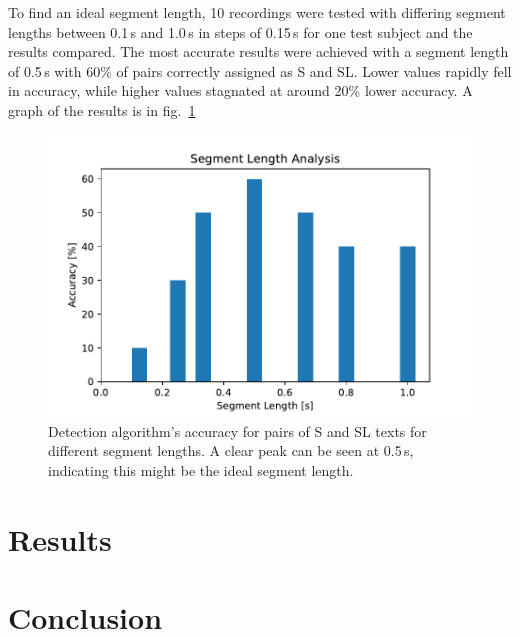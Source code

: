 \documentclass{IEEEtran}
\begin{document}
To find an ideal segment length,
10 recordings were tested with differing segment lengths between 0.1\,s and 1.0\,s in steps of 0.15\,s for one test subject and the results compared.
The most accurate results were achieved with a segment length of 0.5\,s with 60\% of pairs correctly assigned as S and SL.
Lower values rapidly fell in accuracy,
while higher values stagnated at around 20\% lower accuracy.
A graph of the results is in fig.\ \ref{segmentlength}

\begin{figure}[h]
\centering
\includegraphics[scale=0.5]{seglen.pdf}
\caption{Detection algorithm's accuracy for pairs of S and SL texts for different segment lengths. A clear peak can be seen at 0.5\,s, indicating this might be the ideal segment length.}\label{segmentlength}
\end{figure}

\section{Results}

\section{Conclusion}

\nocite{*}

\printbibliography
\end{document}
